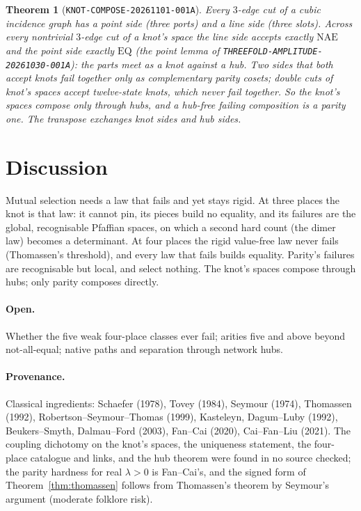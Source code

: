 \documentclass[11pt]{article}
\newtheorem{theorem}{Theorem}
\theoremstyle{definition}
\newcommand{\NAE}{\mathrm{NAE}}
\newcommand{\EQ}{\mathrm{EQ}}
\begin{document}
\begin{theorem}[\texttt{KNOT-COMPOSE-20261101-001A}]\label{thm:hubs}
Every $3$-edge cut of a cubic incidence graph has a point side (three ports) and a line side (three slots). Across every nontrivial
$3$-edge cut of a knot's space the line side accepts exactly $\NAE$ and the point side exactly $\EQ$ (the point lemma of
\texttt{THREEFOLD-AMPLITUDE-20261030-001A}): the parts meet as a knot against a hub. Two sides that both accept knots fail together only
as complementary parity cosets; double cuts of knot's spaces accept twelve-state knots, which never fail together. So the knot's spaces
compose only through hubs, and a hub-free failing composition is a parity one. The transpose exchanges knot sides and hub sides.
\end{theorem}

\section{Discussion}

Mutual selection needs a law that fails and yet stays rigid. At three places the knot is that law: it cannot pin, its pieces build no
equality, and its failures are the global, recognisable Pfaffian spaces, on which a second hard count (the dimer law) becomes a determinant.
At four places the rigid value-free law never fails (Thomassen's threshold), and every law that fails builds equality. Parity's failures
are recognisable but local, and select nothing. The knot's spaces compose through hubs; only parity composes directly.

\paragraph{Open.} Whether the five weak four-place classes ever fail; arities five and above beyond not-all-equal; native paths and
separation through network hubs.

\paragraph{Provenance.} Classical ingredients: Schaefer (1978), Tovey (1984), Seymour (1974), Thomassen (1992),
Robertson--Seymour--Thomas (1999), Kasteleyn, Dagum--Luby (1992), Beukers--Smyth, Dalmau--Ford (2003), Fan--Cai (2020),
Cai--Fan--Liu (2021). The coupling dichotomy on the knot's spaces, the uniqueness statement, the four-place catalogue and links, and the
hub theorem were found in no source checked; the parity hardness for real $\lambda>0$ is Fan--Cai's, and the signed form of
Theorem~\ref{thm:thomassen} follows from Thomassen's theorem by Seymour's argument (moderate folklore risk).
\end{document}
